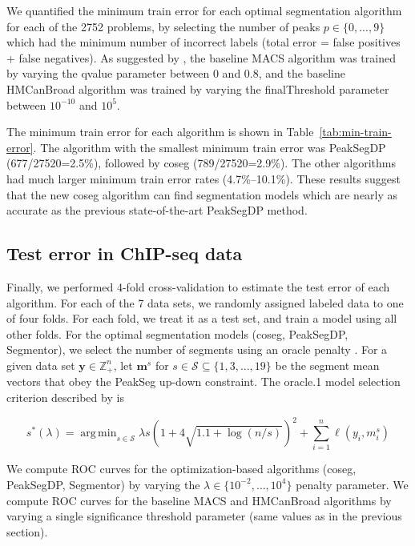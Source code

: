 \documentclass{article}
\DeclareMathOperator*{\argmin}{arg\,min}
\newcommand{\ZZ}{\mathbb Z}
\begin{document}
We quantified the minimum train error for each optimal segmentation
algorithm for each of the 2752 problems, by selecting the number of
peaks $p\in\{0, ..., 9\}$ which had the minimum number of incorrect
labels (total error = false positives + false negatives). As suggested
by \citet{HOCKING2016-chipseq}, the baseline MACS algorithm was
trained by varying the qvalue parameter between 0 and 0.8, and the
baseline HMCanBroad algorithm was trained by varying the
finalThreshold parameter between $10^{-10}$ and $10^5$.

The minimum train error for each algorithm is shown in
Table~\ref{tab:min-train-error}. The algorithm with the smallest
minimum train error was PeakSegDP (677/27520=2.5\%), followed by coseg
(789/27520=2.9\%). The other algorithms had much larger minimum train
error rates (4.7\%--10.1\%). These results suggest that the new coseg
algorithm can find segmentation models which are nearly as accurate as
the previous state-of-the-art PeakSegDP method.


\subsection{Test error in ChIP-seq data}

Finally, we performed 4-fold cross-validation to estimate the test
error of each algorithm. For each of the 7 data sets, we randomly
assigned labeled data to one of four folds. For each fold, we treat it
as a test set, and train a model using all other folds. For the
optimal segmentation models (coseg, PeakSegDP, Segmentor), we select
the number of segments using an oracle penalty
\citep{cleynen2013segmentation}. For a given data set
$\mathbf y\in\ZZ_+^n$, let $\mathbf m^s$ for
$s\in\mathcal S\subseteq \{1, 3,\dots, 19\}$ be the segment mean
vectors that obey the PeakSeg up-down constraint. The oracle.1 model
selection criterion described by \citet{HOCKING-PeakSeg} is

\begin{equation}
  \label{eq:oracle}
  s^*(\lambda) = \argmin_{s\in\mathcal S}
  \lambda s\left(1 + 4\sqrt{1.1 + \log(n/s)}\right)^2
  +\sum_{i=1}^n \ell(y_i, m_i^s)
\end{equation}

We compute ROC curves for the optimization-based algorithms (coseg,
PeakSegDP, Segmentor) by varying the
$\lambda\in\{10^{-2}, \dots,10^4\}$ penalty parameter. We compute ROC
curves for the baseline MACS and HMCanBroad algorithms by varying a
single significance threshold parameter (same values as in the
previous section).
\end{document}
